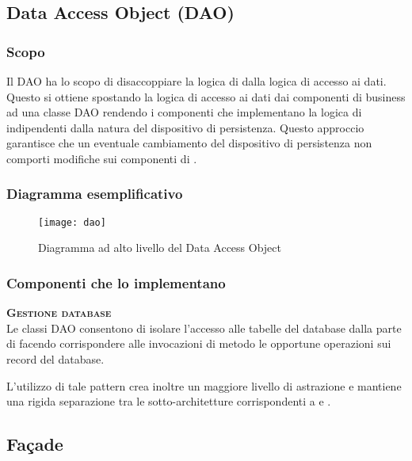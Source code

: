 \subsection{Data Access Object (DAO)}

\subsubsection{Scopo}
Il  DAO ha lo scopo di disaccoppiare la logica di  dalla logica di accesso ai dati. Questo si ottiene spostando la logica di accesso ai dati dai componenti di business ad una classe DAO rendendo i componenti che implementano la logica di  indipendenti dalla natura del dispositivo di persistenza. Questo approccio garantisce che un eventuale cambiamento del dispositivo di persistenza non comporti modifiche sui componenti di .

\subsubsection{Diagramma esemplificativo}
\begin{figure}[H]
\centering
\texttt{[image: dao]}
\caption{Diagramma ad alto livello del  Data Access Object}\label{fig:dao}
\end{figure}

\subsubsection{Componenti che lo implementano}
\begin{description}
\item{\scshape\bfseries Gestione database}\\
Le classi DAO consentono di isolare l'accesso alle tabelle del database dalla parte di  facendo corrispondere alle invocazioni di metodo le opportune operazioni sui record del database.

L'utilizzo di tale pattern crea inoltre un maggiore livello di astrazione e mantiene una rigida separazione tra le sotto-architetture corrispondenti a  e .
\end{description}

\subsection{Façade}

